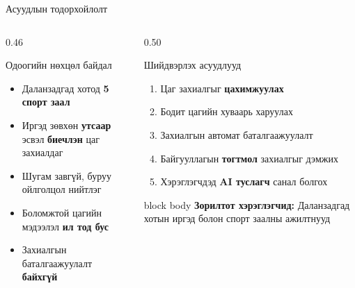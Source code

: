 \documentclass[14pt,aspectratio=169]{beamer}
\begin{document}
\begin{frame}{Асуудлын тодорхойлолт}
  \begin{columns}[T]
    \begin{column}{0.46\textwidth}
      \begin{block}{Одоогийн нөхцөл байдал}
        \begin{itemize}
          \item Даланзадгад хотод \textbf{5 спорт заал}
          \item Иргэд зөвхөн \textbf{утсаар} эсвэл \textbf{биечлэн} цаг захиалдаг
          \item Шугам завгүй, буруу ойлголцол нийтлэг
          \item Боломжтой цагийн мэдээлэл \textbf{ил тод бус}
          \item Захиалгын баталгаажуулалт \textbf{байхгүй}
        \end{itemize}
      \end{block}
    \end{column}
    \begin{column}{0.50\textwidth}
      \begin{alertblock}{Шийдвэрлэх асуудлууд}
        \begin{enumerate}
          \item Цаг захиалгыг \textbf{цахимжуулах}
          \item Бодит цагийн хуваарь харуулах
          \item Захиалгын автомат баталгаажуулалт
          \item Байгууллагын \textbf{тогтмол} захиалгыг дэмжих
          \item Хэрэглэгчдэд \textbf{AI туслагч} санал болгох
        \end{enumerate}
      \end{alertblock}
      \vspace{4pt}
      \begin{beamercolorbox}[sep=4pt,rounded=true]{block body}
        \centering\small
        \textbf{Зорилтот хэрэглэгчид:} Даланзадгад хотын иргэд
        болон спорт заалны ажилтнууд
      \end{beamercolorbox}
    \end{column}
  \end{columns}
\end{frame}

\end{document}
